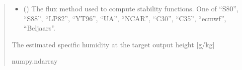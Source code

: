 \documentclass[letterpaper,10pt,english]{sphinxmanual}
\begin{document}
\begin{fulllineitems}
\begin{quote}
\begin{description}
\begin{itemize}
\item {}
\sphinxAtStartPar
{} () \textendash{} The flux method used to compute stability functions. One of “S80”, “S88”,
“LP82”, “YT96”, “UA”, “NCAR”, “C30”, “C35”, “ecmwf”, “Beljaars”.

\end{itemize}

\sphinxAtStartPar
The estimated specific humidity at the target output height {[}g/kg{]}

\sphinxAtStartPar
numpy.ndarray

\end{description}\end{quote}

\end{fulllineitems}

\end{document}
